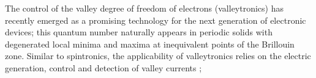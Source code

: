 \begin{resumo}[Abstract]
The control of the valley degree of freedom of electrons (valleytronics)  has recently emerged as a promising technology for the next generation of electronic devices; this quantum  number naturally appears in periodic solids with  degenerated local minima and maxima at inequivalent  points of the Brillouin zone. Similar to spintronics, the applicability of valleytronics relies on the electric generation, control and detection of valley currents \citeauthor{Valley2D}; %
\end{resumo}

